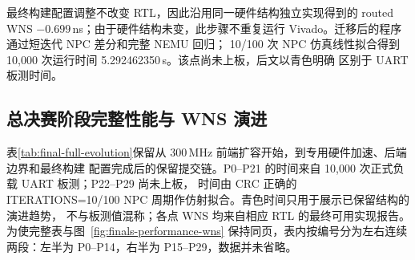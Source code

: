 最终构建配置调整不改变 RTL，因此沿用同一硬件结构独立实现得到的 routed WNS
$-0.699$\,ns；由于硬件结构未变，此步骤不重复运行 Vivado。迁移后的程序通过短迭代 NPC 差分和完整 NEMU 回归；
10/100 次 NPC 仿真线性拟合得到 10,000 次运行时间 5.292462350\,s。该点尚未上板，后文以青色明确
区别于 UART 板测时间。

\subsection{总决赛阶段完整性能与 WNS 演进}\label{sec:performance}

表\ref{tab:final-full-evolution}保留从 300\,MHz 前端扩容开始，到专用硬件加速、后端边界和最终构建
配置完成后的保留提交链。P0--P21 的时间来自 10,000 次正式负载 UART 板测；P22--P29 尚未上板，
时间由 CRC 正确的 ITERATIONS=10/100 NPC 周期作仿射拟合。青色时间只用于展示已保留结构的演进趋势，
不与板测值混称；各点 WNS 均来自相应 RTL 的最终可用实现报告。为使完整表与图~\ref{fig:finals-performance-wns}
保持同页，表内按编号分为左右连续两段：左半为 P0--P14，右半为 P15--P29，数据并未省略。

